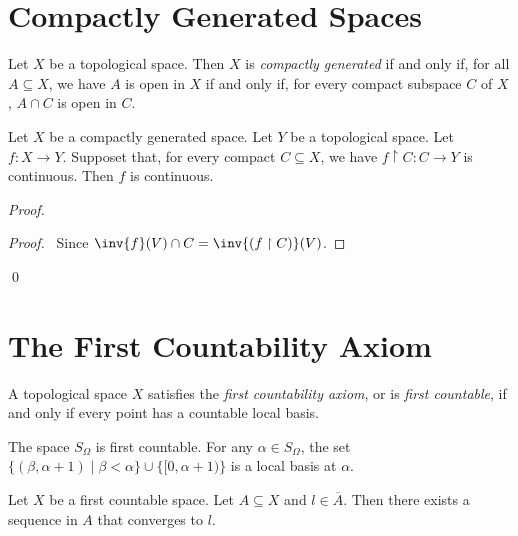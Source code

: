 \section{Compactly Generated Spaces}

\begin{definition}
    Let $X$ be a topological space. Then $X$ is \emph{compactly generated} if and only if, for all $A \subseteq X$,
    we have $A$ is open in $X$ if and only if, for every compact subspace $C$ of $X$, $A \cap C$ is open in $C$.
\end{definition}

\begin{lemma}
    \label{lemma:compactly_generated_continuous}
    Let $X$ be a compactly generated space. Let $Y$ be a topological space. Let $f : X \rightarrow Y$. Supposet that,
    for every compact $C \subseteq X$, we have $f \restriction C : C \rightarrow Y$ is continuous. Then $f$ is continuous.
\end{lemma}

\begin{proof}
    \pf
    \begin{proof}
        \pf\ Since $\inv{f}(V) \cap C = \inv{(f \restriction C)}(V)$.
    \end{proof}
    \qed
\end{proof}
\section{The First Countability Axiom}

\begin{definition}
    A topological space $X$ satisfies the \emph{first countability axiom}, or is \emph{first countable}, if and only if every point has a countable local basis.
\end{definition}

\begin{example}
    The space $S_\Omega$ is first countable. For any $\alpha \in S_\Omega$,
    the set $\{ (\beta, \alpha + 1) \mid \beta < \alpha \} \cup \{ [0, \alpha + 1) \}$
    is a local basis at $\alpha$.
\end{example}

\begin{lemma}
    Let $X$ be a first countable space. Let $A \subseteq X$ and $l \in \overline{A}$.
    Then there exists a sequence in $A$ that converges to $l$.
\end{lemma}

